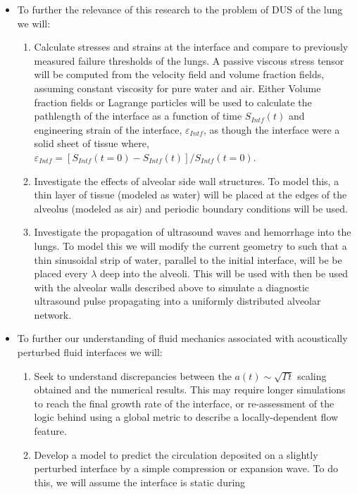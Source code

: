 \begin{itemize}
\item To further the relevance of this research to the problem of
  \ac{DUS} of the lung we will:
  \begin{enumerate}
  \item Calculate stresses and strains at the interface and compare to
    previously measured failure thresholds of the lungs. A passive
    viscous stress tensor will be computed from the velocity field and
    volume fraction fields, assuming constant viscosity for pure water
    and air. Either Volume fraction fields or Lagrange particles will
    be used to calculate the pathlength of the interface as a function
    of time $S_{Intf}(t)$ and engineering strain of the interface,
    $\varepsilon_{Intf}$, as though the interface were a solid sheet
    of tissue where,
    $\varepsilon_{Intf}=[S_{Intf}(t=0)-S_{Intf}(t)]/S_{Intf}(t=0)$.
  \item Investigate the effects of alveolar side wall structures. To
    model this, a thin layer of tissue (modeled as water) will be
    placed at the edges of the alveolus (modeled as air) and periodic
    boundary conditions will be used.
  \item Investigate the propagation of ultrasound waves and hemorrhage
    into the lungs. To model this we will modify the current geometry
    to such that a thin sinusoidal strip of water, parallel to the
    initial interface, will be be placed every $\lambda$ deep into the
    alveoli. This will be used with then be used with the alveolar
    walls described above to simulate a diagnostic ultrasound pulse
    propagating into a uniformly distributed alveolar network.
  \end{enumerate}
\item To further our understanding of fluid mechanics
  associated with acoustically perturbed fluid interfaces we will:
  \begin{enumerate}
  \item Seek to understand discrepancies between the
    $a(t)\sim\sqrt{\Gamma t}$ scaling obtained and the numerical
    results. This may require longer simulations to reach the final
    growth rate of the interface, or re-assessment of the logic behind
    using a global metric to describe a locally-dependent flow
    feature.
  \item Develop a model to predict the circulation deposited on a
    slightly perturbed interface by a simple compression or expansion
    wave. To do this, we will assume the interface is static during

\end{enumerate}
\end{itemize}
